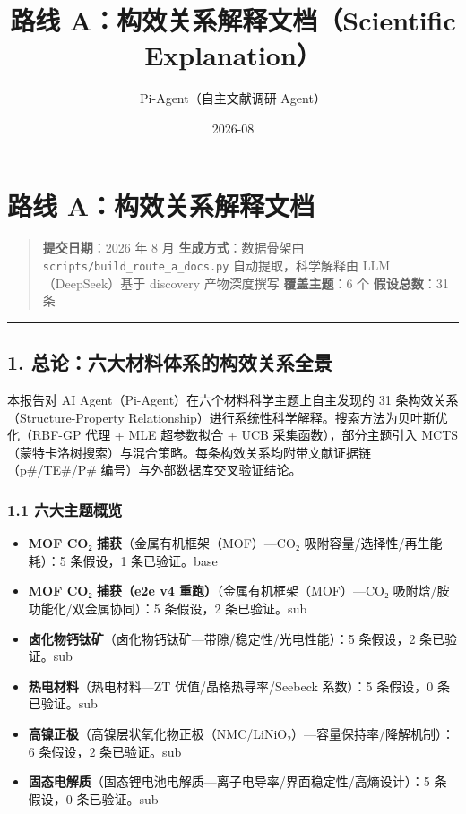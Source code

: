 \documentclass[12pt,a4paper]{ctexart}
\title{ 路线 A：构效关系解释文档（Scientific Explanation） }
\date{ 2026-08 }
\author{Pi-Agent（自主文献调研 Agent）}
\providecommand{\tightlist}{%
  \setlength{\itemsep}{0pt}\setlength{\parskip}{0pt}}
\begin{document}
\maketitle
\sloppy  %

\section{路线 A：构效关系解释文档}\label{ux8defux7ebf-aux6784ux6548ux5173ux7cfbux89e3ux91caux6587ux6863}

\begin{quote}
\textbf{提交日期}：2026 年 8 月 \textbf{生成方式}：数据骨架由 \texttt{scripts/build\_route\_a\_docs.py} 自动提取，科学解释由 LLM（DeepSeek）基于 discovery 产物深度撰写 \textbf{覆盖主题}：6 个 \textbar{} \textbf{假设总数}：31 条
\end{quote}

\begin{center}\rule{0.5\linewidth}{0.5pt}\end{center}

\subsection{1. 总论：六大材料体系的构效关系全景}\label{ux603bux8bbaux516dux5927ux6750ux6599ux4f53ux7cfbux7684ux6784ux6548ux5173ux7cfbux5168ux666f}

本报告对 AI Agent（Pi-Agent）在六个材料科学主题上自主发现的 31 条构效关系（Structure-Property Relationship）进行系统性科学解释。搜索方法为贝叶斯优化（RBF-GP 代理 + MLE 超参数拟合 + UCB 采集函数），部分主题引入 MCTS（蒙特卡洛树搜索）与混合策略。每条构效关系均附带文献证据链（p\#/TE\#/P\# 编号）与外部数据库交叉验证结论。

\subsubsection{1.1 六大主题概览}\label{ux516dux5927ux4e3bux9898ux6982ux89c8}

\begin{itemize}
\tightlist
\item
  \textbf{MOF CO₂ 捕获}（金属有机框架（MOF）---CO₂ 吸附容量/选择性/再生能耗）：5 条假设，1 条已验证。base
\item
  \textbf{MOF CO₂ 捕获（e2e v4 重跑）}（金属有机框架（MOF）---CO₂ 吸附焓/胺功能化/双金属协同）：5 条假设，2 条已验证。sub
\item
  \textbf{卤化物钙钛矿}（卤化物钙钛矿---带隙/稳定性/光电性能）：5 条假设，2 条已验证。sub
\item
  \textbf{热电材料}（热电材料---ZT 优值/晶格热导率/Seebeck 系数）：5 条假设，0 条已验证。sub
\item
  \textbf{高镍正极}（高镍层状氧化物正极（NMC/LiNiO₂）---容量保持率/降解机制）：6 条假设，2 条已验证。sub
\item
  \textbf{固态电解质}（固态锂电池电解质---离子电导率/界面稳定性/高熵设计）：5 条假设，0 条已验证。sub
\end{itemize}
\end{document}
